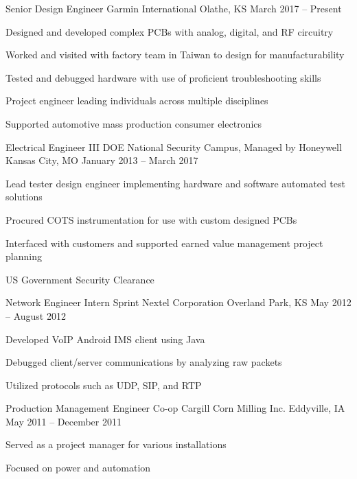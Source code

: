 \documentclass[]{awesome-cv}
\begin{document}
\vspace{-2mm}
\begin{cventries}
	\cventry
	{Senior Design Engineer}
	{Garmin International}
	{Olathe, KS}
	{March 2017 – Present}
	{\begin{cvitems}
		\item {Designed and developed complex PCBs with analog, digital, and RF circuitry}
		\item {Worked and visited with factory team in Taiwan to design for manufacturability}
		\item {Tested and debugged hardware with use of proficient troubleshooting skills}
		\item {Project engineer leading individuals across multiple disciplines}
		\item {Supported automotive mass production consumer electronics}
		\end{cvitems}}
	\cventry
	{Electrical Engineer III}
	{DOE National Security Campus, Managed by Honeywell}
	{Kansas City, MO}
	{January 2013 – March 2017}
	{\begin{cvitems}
		\item {Lead tester design engineer implementing hardware and software automated test solutions}
		\item {Procured COTS instrumentation for use with custom designed PCBs}
		\item {Interfaced with customers and supported earned value management project planning}
		\item {US Government Security Clearance}
		\end{cvitems}}
	\cventry
	{Network Engineer Intern}
	{Sprint Nextel Corporation}
	{Overland Park, KS}
	{May 2012 – August 2012}
	{\begin{cvitems}
		\item {Developed VoIP Android IMS client using Java}
		\item {Debugged client/server communications by analyzing raw packets}
		\item {Utilized protocols such as UDP, SIP, and RTP}
		\end{cvitems}}
	\cventry
	{Production Management Engineer Co-op}
	{Cargill Corn Milling Inc.}
	{Eddyville, IA}
	{May 2011 – December 2011}
	{\begin{cvitems}
		\item {Served as a project manager for various installations}
		\item {Focused on power and automation}

\end{cvitems}}
\end{cventries}
\end{document}
